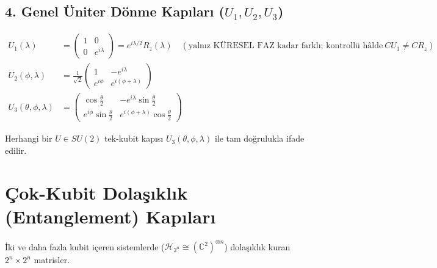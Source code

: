 \documentclass[11pt, a4paper]{article}
\begin{document}
\subsection{4. Genel Üniter Dönme Kapıları ($U_1, U_2, U_3$)}
\begin{align}
U_1(\lambda) &= \begin{pmatrix} 1 & 0 \\ 0 & e^{i\lambda} \end{pmatrix} = e^{i\lambda/2} R_z(\lambda) \quad (\text{yalnız KÜRESEL FAZ kadar farklı; kontrollü hâlde}\ CU_1 \neq CR_z) \\
U_2(\phi, \lambda) &= \frac{1}{\sqrt{2}} \begin{pmatrix} 1 & -e^{i\lambda} \\ e^{i\phi} & e^{i(\phi+\lambda)} \end{pmatrix} \\
U_3(\theta, \phi, \lambda) &= \begin{pmatrix} \cos\frac{\theta}{2} & -e^{i\lambda}\sin\frac{\theta}{2} \\ e^{i\phi}\sin\frac{\theta}{2} & e^{i(\phi+\lambda)}\cos\frac{\theta}{2} \end{pmatrix}
\end{align}

Herhangi bir $U \in SU(2)$ tek-kubit kapısı $U_3(\theta, \phi, \lambda)$ ile tam doğrulukla ifade edilir.

\section{Çok-Kubit Dolaşıklık (Entanglement) Kapıları}

İki ve daha fazla kubit içeren sistemlerde ($\mathcal{H}_{2^n} \cong (\mathbb{C}^2)^{\otimes n}$) dolaşıklık kuran $2^n \times 2^n$ matrisler.
\end{document}
